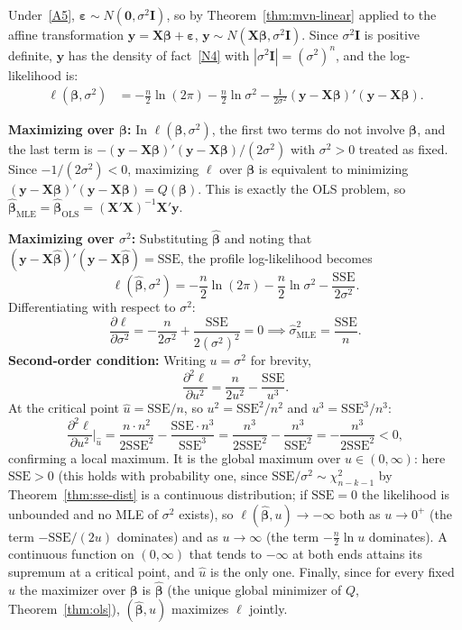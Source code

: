 \documentclass[12pt,a4paper]{article}
\makeatletter
\theoremstyle{definition}
\renewenvironment{proof}[1][\proofname]{\par
  \pushQED{\qed}%
  \normalfont \topsep6\p@\@plus6\p@\relax
  \trivlist
  \item[\hskip\labelsep\bfseries #1\@addpunct{.}]\ignorespaces
}{%
  \popQED\endtrivlist\@endpefalse
}
\newcommand{\SSE}{\mathrm{SSE}}
\newcommand{\bX}{\mathbf{X}}
\newcommand{\by}{\mathbf{y}}
\def\bb{\boldsymbol{\beta}}
\newcommand{\be}{\boldsymbol{\varepsilon}}
\newcommand{\bI}{\mathbf{I}}
\newcommand{\bzero}{\mathbf{0}}
\makeatother
\begin{document}
\begin{proof}
Under~\ref{A5}, $\be \sim N(\bzero, \sigma^2\bI)$, so by Theorem~\ref{thm:mvn-linear} applied to the affine transformation $\by = \bX\bb + \be$, $\by \sim N(\bX\bb, \sigma^2\bI)$. Since $\sigma^2\bI$ is positive definite, $\by$ has the density of fact~\ref{N4} with $|\sigma^2\bI| = (\sigma^2)^n$, and the log-likelihood is:
\begin{align*}
\ell(\bb, \sigma^2) &= -\frac{n}{2}\ln(2\pi) - \frac{n}{2}\ln\sigma^2 - \frac{1}{2\sigma^2}(\by - \bX\bb)'(\by - \bX\bb).
\end{align*}

\textbf{Maximizing over $\bb$:} In $\ell(\bb, \sigma^2)$, the first two terms do not involve $\bb$, and the last term is $-(\by - \bX\bb)'(\by - \bX\bb)/(2\sigma^2)$ with $\sigma^2 > 0$ treated as fixed. Since $-1/(2\sigma^2) < 0$, maximizing $\ell$ over $\bb$ is equivalent to minimizing $(\by - \bX\bb)'(\by - \bX\bb) = Q(\bb)$. This is exactly the OLS problem, so $\hat{\bb}_{\mathrm{MLE}} = \hat{\bb}_{\mathrm{OLS}} = (\bX'\bX)^{-1}\bX'\by$.

\textbf{Maximizing over $\sigma^2$:} Substituting $\hat{\bb}$ and noting that $(\by - \bX\hat{\bb})'(\by - \bX\hat{\bb}) = \SSE$, the profile log-likelihood becomes
\[
\ell(\hat{\bb}, \sigma^2) = -\frac{n}{2}\ln(2\pi) - \frac{n}{2}\ln\sigma^2 - \frac{\SSE}{2\sigma^2}.
\]
Differentiating with respect to $\sigma^2$:
\[
\frac{\partial \ell}{\partial \sigma^2} = -\frac{n}{2\sigma^2} + \frac{\SSE}{2(\sigma^2)^2} = 0 \implies \hat{\sigma}^2_{\mathrm{MLE}} = \frac{\SSE}{n}.
\]
\textbf{Second-order condition:} Writing $u = \sigma^2$ for brevity,
\[
\frac{\partial^2 \ell}{\partial u^2} = \frac{n}{2u^2} - \frac{\SSE}{u^3}.
\]
At the critical point $\hat{u} = \SSE/n$, so $u^2 = \SSE^2/n^2$ and $u^3 = \SSE^3/n^3$:
\[
\frac{\partial^2 \ell}{\partial u^2}\bigg|_{\hat{u}} = \frac{n \cdot n^2}{2\SSE^2} - \frac{\SSE \cdot n^3}{\SSE^3} = \frac{n^3}{2\SSE^2} - \frac{n^3}{\SSE^2} = -\frac{n^3}{2\SSE^2} < 0,
\]
confirming a local maximum. It is the global maximum over $u \in (0, \infty)$: here $\SSE > 0$ (this holds with probability one, since $\SSE/\sigma^2 \sim \chi^2_{n-k-1}$ by Theorem~\ref{thm:sse-dist} is a continuous distribution; if $\SSE = 0$ the likelihood is unbounded and no MLE of $\sigma^2$ exists), so $\ell(\hat{\bb}, u) \to -\infty$ both as $u \to 0^+$ (the term $-\SSE/(2u)$ dominates) and as $u \to \infty$ (the term $-\tfrac{n}{2}\ln u$ dominates). A continuous function on $(0,\infty)$ that tends to $-\infty$ at both ends attains its supremum at a critical point, and $\hat{u}$ is the only one. Finally, since for every fixed $u$ the maximizer over $\bb$ is $\hat{\bb}$ (the unique global minimizer of $Q$, Theorem~\ref{thm:ols}), $(\hat{\bb}, \hat{u})$ maximizes $\ell$ jointly.


\end{proof}
\end{document}
